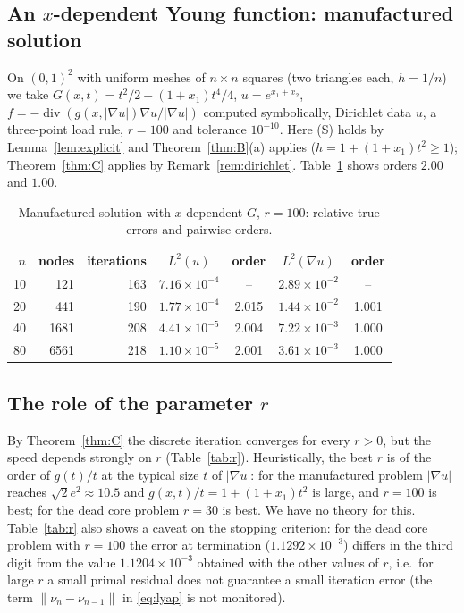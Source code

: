 \documentclass[11pt]{amsart}
\theoremstyle{definition}
\theoremstyle{remark}
\numberwithin{equation}{section}
\newcommand{\abs}[1]{\lvert #1\rvert}
\newcommand{\norm}[1]{\lVert #1\rVert}
\DeclareMathOperator{\divg}{div}
\begin{document}
\subsection{An $x$-dependent Young function: manufactured solution}\label{ssec:manufactured}
On $(0,1)^2$ with uniform meshes of $n\times n$ squares (two triangles each, $h=1/n$) we take $G(x,t)=t^2/2+(1+x_1)t^4/4$, $u=e^{x_1+x_2}$, $f=-\divg(g(x,\abs{\nabla u})\nabla u/\abs{\nabla u})$ computed symbolically, Dirichlet data $u$, a three-point load rule, $r=100$ and tolerance $10^{-10}$. Here (S) holds by Lemma~\ref{lem:explicit} and Theorem~\ref{thm:B}(a) applies ($h=1+(1+x_1)t^2\ge1$); Theorem~\ref{thm:C} applies by Remark~\ref{rem:dirichlet}. Table~\ref{tab:manufactured} shows orders $2.00$ and $1.00$.

\begin{table}[t]
\caption{Manufactured solution with $x$-dependent $G$, $r=100$: relative true errors and pairwise orders.}\label{tab:manufactured}
\small
\begin{tabular}{@{}rrrcccc@{}}
\toprule
$n$ & nodes & iterations & $L^2(u)$ & order & $L^2(\nabla u)$ & order\\
\midrule
10 & 121 & 163 & $7.16\times10^{-4}$ & -- & $2.89\times10^{-2}$ & --\\
20 & 441 & 190 & $1.77\times10^{-4}$ & 2.015 & $1.44\times10^{-2}$ & 1.001\\
40 & 1681 & 208 & $4.41\times10^{-5}$ & 2.004 & $7.22\times10^{-3}$ & 1.000\\
80 & 6561 & 218 & $1.10\times10^{-5}$ & 2.001 & $3.61\times10^{-3}$ & 1.000\\
\bottomrule
\end{tabular}
\end{table}

\subsection{The role of the parameter $r$}\label{ssec:r}
By Theorem~\ref{thm:C} the discrete iteration converges for every $r>0$, but the speed depends strongly on $r$ (Table~\ref{tab:r}). Heuristically, the best $r$ is of the order of $g(t)/t$ at the typical size $t$ of $\abs{\nabla u}$: for the manufactured problem $\abs{\nabla u}$ reaches $\sqrt2e^2\approx10.5$ and $g(x,t)/t=1+(1+x_1)t^2$ is large, and $r=100$ is best; for the dead core problem $r=30$ is best. We have no theory for this. Table~\ref{tab:r} also shows a caveat on the stopping criterion: for the dead core problem with $r=100$ the error at termination ($1.1292\times10^{-3}$) differs in the third digit from the value $1.1204\times10^{-3}$ obtained with the other values of $r$, i.e.\ for large $r$ a small primal residual does not guarantee a small iteration error (the term $\norm{\nu_n-\nu_{n-1}}$ in \eqref{eq:lyap} is not monitored).
\end{document}
